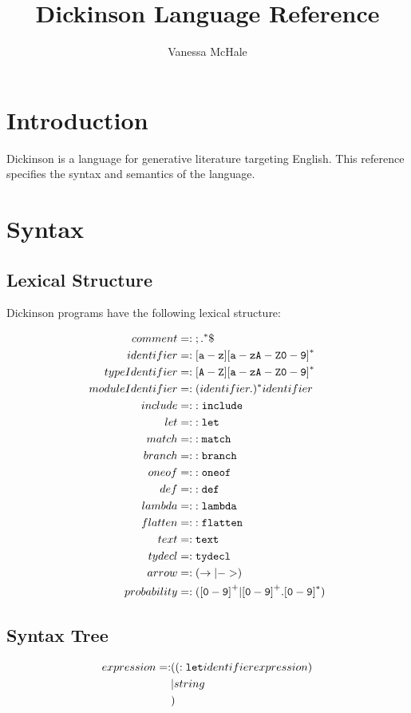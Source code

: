 \documentclass{book}
\begin{document}
\title{Dickinson Language Reference}
\author {Vanessa McHale}
\maketitle

\tableofcontents

\section{Introduction}

Dickinson is a language for generative literature targeting English. This reference specifies the syntax and semantics of the language.

\section{Syntax}

\subsection{Lexical Structure}

Dickinson programs have the following lexical structure:

\begin{align*}
    comment &=: {\tt ; .}^*\$ \\
    identifier &=: {\tt [a-z][a-zA-Z0-9]}^* \\
    typeIdentifier &=: {\tt [A-Z][a-zA-Z0-9]}^* \\
    moduleIdentifier &=: (identifier.)^* identifier \\
    include &=: {\tt :include} \\
    let &=: {\tt :let} \\
    match &=: {\tt :match} \\
    branch &=: {\tt :branch} \\
    oneof &=: {\tt :oneof} \\
    def &=: {\tt :def} \\
    lambda &=: {\tt :lambda} \\
    flatten &=: {\tt :flatten} \\
    text &=: {\tt text} \\
    tydecl &=: {\tt tydecl} \\
    arrow &=: (\rightarrow | {\tt ->}) \\
    probability &=: ({\tt [0-9]}^+| {\tt [0-9]}^+.{\tt [0-9]}^*)
\end{align*}

\subsection{Syntax Tree}

\begin{align*}
    expression =: &( ({\tt :let} identifier expression) \\
               &| string \\
               &)
\end{align*}
\end{document}
